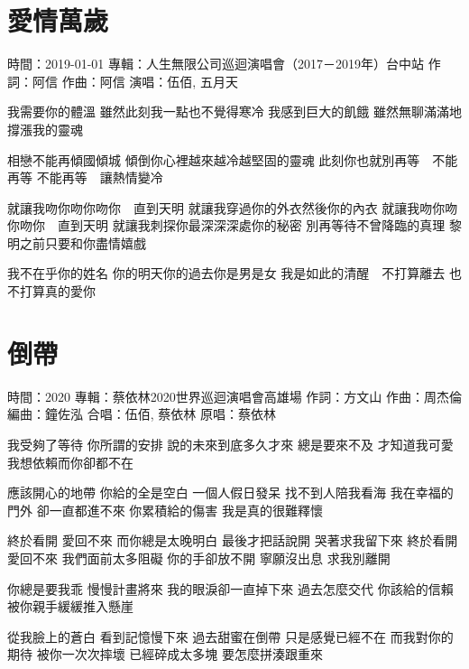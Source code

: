 \documentclass[UTF8,a4paper,oneside,twocolumn,12pt]{ctexbook}
\newcommand{\infopair}[2]{\textbullet #1：#2}
\newcommand{\zc}[1][伍佰]{\infopair{作詞}{#1}}
\newcommand{\zq}[1][伍佰]{\infopair{作曲}{#1}}
\newcommand{\bq}[1][伍佰]{\infopair{編曲}{#1}}
\newcommand{\zj}[1]{\infopair{專輯}{#1}}
\newcommand{\yc}[1]{\infopair{原唱}{#1}}
\newcommand{\sj}[1]{\infopair{時間}{#1}}
\newenvironment{info}{\begin{flushleft}\kaishu
	}
	{\end{flushleft}\normalsize\yahei\par}
\newenvironment{lyric}{
	}
{}
\begin{document}
\section{愛情萬歲} %
\begin{info}
	\sj{2019-01-01}
	\zj{人生無限公司巡迴演唱會（2017－2019年）台中站}
	\zc[阿信]
	\zq[阿信]
	\infopair{演唱}{伍佰, 五月天}
\end{info}
\begin{lyric}
	我需要你的體溫
	雖然此刻我一點也不覺得寒冷
	我感到巨大的飢餓
	雖然無聊滿滿地撐漲我的靈魂

	相戀不能再傾國傾城
	傾倒你心裡越來越冷越堅固的靈魂
	此刻你也就別再等　不能再等
	不能再等　讓熱情變冷

	就讓我吻你吻你吻你　直到天明
	就讓我穿過你的外衣然後你的內衣
	就讓我吻你吻你吻你　直到天明
	就讓我刺探你最深深深處你的秘密
	別再等待不曾降臨的真理
	黎明之前只要和你盡情嬉戲

	我不在乎你的姓名
	你的明天你的過去你是男是女
	我是如此的清醒　不打算離去
	也不打算真的愛你
\end{lyric}

\section{倒帶}
\begin{info}
	\sj{2020}
	\zj{蔡依林2020世界巡迴演唱會高雄場}
	\zc[方文山]
	\zq[周杰倫]
	\bq[鐘佐泓]
	\infopair{合唱}{伍佰, 蔡依林}
	\yc{蔡依林}
\end{info}
\begin{lyric}
	我受夠了等待 你所謂的安排
	說的未來到底多久才來
	總是要來不及 才知道我可愛
	我想依賴而你卻都不在

	應該開心的地帶 你給的全是空白
	一個人假日發呆 找不到人陪我看海
	我在幸福的門外 卻一直都進不來
	你累積給的傷害 我是真的很難釋懷

	終於看開 愛回不來 而你總是太晚明白
	最後才把話說開 哭著求我留下來
	終於看開 愛回不來 我們面前太多阻礙
	你的手卻放不開 寧願沒出息 求我別離開

	你總是要我乖 慢慢計畫將來
	我的眼淚卻一直掉下來
	過去怎麼交代 你該給的信賴
	被你親手緩緩推入懸崖

	從我臉上的蒼白 看到記憶慢下來
	過去甜蜜在倒帶 只是感覺已經不在
	而我對你的期待 被你一次次摔壞
	已經碎成太多塊 要怎麼拼湊跟重來
\end{lyric}
\end{document}
